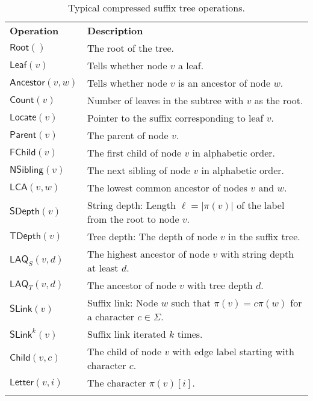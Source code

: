 \documentclass[a4paper,11pt]{llncs}
\newcommand{\abs}[1]{\ensuremath{\lvert #1 \rvert}}
\newcommand{\mRoot}{\ensuremath{\mathsf{Root}}}
\newcommand{\mLeaf}{\ensuremath{\mathsf{Leaf}}}
\newcommand{\mAncestor}{\ensuremath{\mathsf{Ancestor}}}
\newcommand{\mCount}{\ensuremath{\mathsf{Count}}}
\newcommand{\mLocate}{\ensuremath{\mathsf{Locate}}}
\newcommand{\mParent}{\ensuremath{\mathsf{Parent}}}
\newcommand{\mFChild}{\ensuremath{\mathsf{FChild}}}
\newcommand{\mNSibling}{\ensuremath{\mathsf{NSibling}}}
\newcommand{\mLCA}{\ensuremath{\mathsf{LCA}}}
\newcommand{\mSDepth}{\ensuremath{\mathsf{SDepth}}}
\newcommand{\mTDepth}{\ensuremath{\mathsf{TDepth}}}
\newcommand{\mLAQ}{\ensuremath{\mathsf{LAQ}}}
\newcommand{\mSLink}{\ensuremath{\mathsf{SLink}}}
\newcommand{\mChild}{\ensuremath{\mathsf{Child}}}
\newcommand{\mLetter}{\ensuremath{\mathsf{Letter}}}
\begin{document}
\begin{table}
\centering{}
\caption{Typical compressed suffix tree operations.}\label{table:cst operations}

\begin{tabular}{ll}
\hline
\noalign{\smallskip}
\textbf{Operation}  & \textbf{Description} \\
\noalign{\smallskip}
\hline
\noalign{\smallskip}
$\mRoot()$          & The root of the tree. \\
$\mLeaf(v)$         & Tells whether node $v$ a leaf. \\
$\mAncestor(v,w)$   & Tells whether node $v$ is an ancestor of node $w$. \\
\noalign{\smallskip}
$\mCount(v)$        & Number of leaves in the subtree with $v$ as the root. \\
$\mLocate(v)$       & Pointer to the suffix corresponding to leaf $v$. \\
\noalign{\smallskip}
$\mParent(v)$       & The parent of node $v$. \\
$\mFChild(v)$       & The first child of node $v$ in alphabetic order. \\
$\mNSibling(v)$     & The next sibling of node $v$ in alphabetic order. \\
$\mLCA(v,w)$        & The lowest common ancestor of nodes $v$ and $w$. \\
\noalign{\smallskip}
$\mSDepth(v)$       & String depth: Length $\ell = \abs{\pi(v)}$ of the label from the root to node $v$. \\
$\mTDepth(v)$       & Tree depth: The depth of node $v$ in the suffix tree. \\
$\mLAQ_{S}(v,d)$    & The highest ancestor of node $v$ with string depth at least $d$. \\
$\mLAQ_{T}(v,d)$    & The ancestor of node $v$ with tree depth $d$. \\
\noalign{\smallskip}
$\mSLink(v)$        & Suffix link: Node $w$ such that $\pi(v) = c \pi(w)$ for a character $c \in \Sigma$. \\
$\mSLink^{k}(v)$    & Suffix link iterated $k$ times. \\
\noalign{\smallskip}
$\mChild(v,c)$      & The child of node $v$ with edge label starting with character $c$. \\
$\mLetter(v,i)$     & The character $\pi(v)[i]$. \\
\noalign{\smallskip}
\hline
\end{tabular}
\end{table}
\end{document}
